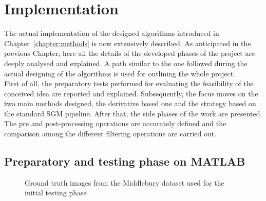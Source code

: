 \chapter{Implementation}
\label{chapter:implementation}

The actual implementation of the designed algorithms introduced in Chapter~\ref{chapter:methods} is now extensively described. 
As anticipated in the previous Chapter, here all the details of the developed phases of the project are deeply analysed and explained. 
A path similar to the one followed during the actual designing of the algorithms is used for outlining the whole project.\\
First of all, the preparatory tests performed for evaluating the feasibility of the conceived idea are reported and explained. 
Subsequently, the focus moves on the two main methods designed, the derivative based one and the strategy based on the standard SGM pipeline.
After that, the side phases of the work are presented. 
The pre and post-processing operations are accurately defined and the comparison among the different filtering operations are carried out.

\section{Preparatory and testing phase on MATLAB}
\label{section:prep-pahse-matlab}

\begin{figure}[t]
	\centering
\caption{Ground truth images from the Middlebury dataset used for the initial testing phase}
\label{fig:test-matlab-01}
\end{figure}

